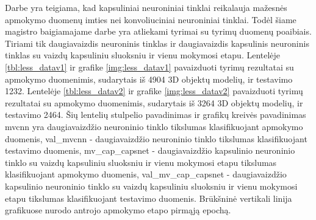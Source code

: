 Darbe \cite{capsNet} yra teigiama, kad kapsuliniai neuroniniai tinklai reikalauja mažesnės apmokymo duomenų imties nei konvoliuciniai neuroniniai tinklai. Todėl šiame magistro baigiamajame darbe yra atliekami tyrimai su tyrimų duomenų poaibiais. Tiriami tik daugiavaizdis neuroninis tinklas ir daugiavaizdis kapsulinis neuroninis tinklas su vaizdų kapsuliniu sluoksniu ir vienu mokymosi etapu. Lentelėje \ref{tbl:less_datav1} ir grafike \ref{img:less_datav1} pavaizduoti tyrimų rezultatai su apmokymo duomenimis, sudarytais iš 4904 3D objektų modelių, ir testavimo 1232. Lentelėje \ref{tbl:less_datav2} ir grafike \ref{img:less_datav2} pavaizduoti tyrimų rezultatai su apmokymo duomenimis, sudarytais iš 3264 3D objektų modelių, ir testavimo 2464. Šių lentelių stulpelio pavadinimas ir grafikų kreivės pavadinimas mvcnn yra daugiavaizdžio neuroninio tinklo tikslumas klasifikuojant apmokymo duomenis, val\_mvcnn - daugiavaizdžio neuroninio tinklo tikslumas klasifikuojant testavimo duomenis, mv\_cap\_capsnet - daugiavaizdžio kapsulinio neuroninio tinklo su vaizdų kapsuliniu sluoksniu ir vienu mokymosi etapu tikslumas klasifikuojant apmokymo duomenis, val\_mv\_cap\_capsnet - daugiavaizdžio kapsulinio neuroninio tinklo su vaizdų kapsuliniu sluoksniu ir vienu mokymosi etapu tikslumas klasifikuojant testavimo duomenis. Brūkšninė vertikali linija grafikuose nurodo antrojo apmokymo etapo pirmąją epochą.

